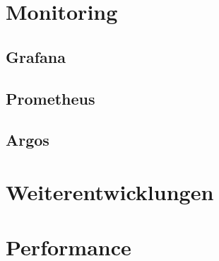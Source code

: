 \section{Monitoring}\label{sec:monitoring}

\subsection{Grafana}\label{subsec:grafana}

\subsection{Prometheus}\label{subsec:prometheus}

\subsection{Argos}\label{subsec:argos}


\section{Weiterentwicklungen}\label{sec:weiterentwicklungen}


\section{Performance}\label{sec:performance}